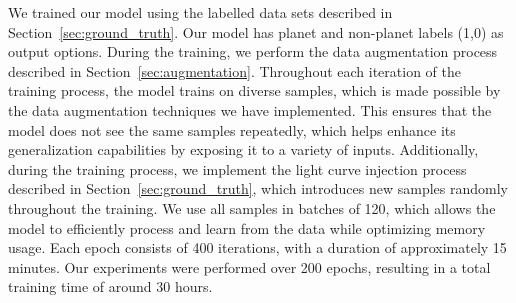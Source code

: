 We trained our model using the labelled data sets described in Section~\ref{sec:ground_truth}. Our model has planet and non-planet labels (1,0) as output options. During the training, we perform the data augmentation process described in Section~\ref{sec:augmentation}. Throughout each iteration of the training process, the model trains on diverse samples, which is made possible by the data augmentation techniques we have implemented. This ensures that the model does not see the same samples repeatedly, which helps enhance its generalization capabilities by exposing it to a variety of inputs. Additionally, during the training process, we implement the light curve injection process described in Section~\ref{sec:ground_truth}, which introduces new samples randomly throughout the training. We use all samples in batches of 120, which allows the model to efficiently process and learn from the data while optimizing memory usage. Each epoch consists of 400 iterations, with a duration of approximately 15 minutes. Our experiments were performed over 200 epochs, resulting in a total training time of around 30 hours. \par
